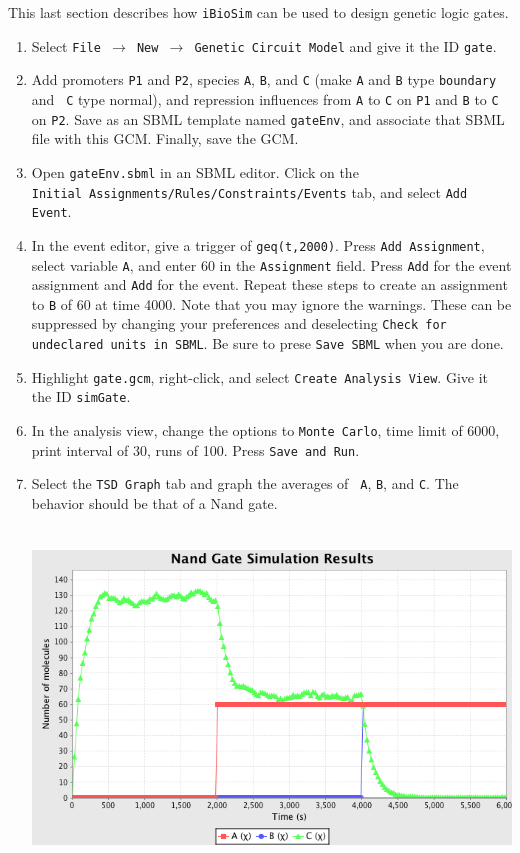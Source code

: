 \documentclass[titlepage,11pt]{article}
\begin{document}
This last section describes how {\tt iBioSim} can be used to design
genetic logic gates.
\begin{enumerate}
\item Select {\tt File $\rightarrow$ New $\rightarrow$ Genetic Circuit
    Model} and give it the ID {\tt gate}.
\item Add promoters {\tt P1} and {\tt P2}, species {\tt A}, {\tt B},
  and {\tt C} (make {\tt A} and {\tt B} type {\tt boundary} and {\tt
    C} type normal), and repression influences from {\tt A} to {\tt C} on
  {\tt P1} and {\tt B} to {\tt C} on {\tt P2}.  Save as an SBML
  template named {\tt gateEnv}, and associate that SBML file with this
  GCM.  Finally, save the GCM.
\item Open {\tt gateEnv.sbml} in an SBML editor.  Click on the\\ 
      {\tt Initial Assignments/Rules/Constraints/Events} tab, and
      select {\tt Add Event}.
\item In the event editor, give a trigger of {\tt geq(t,2000)}.   
      Press {\tt Add Assignment}, select variable {\tt A}, and enter
      60 in the {\tt Assignment} field.  Press {\tt Add} for the event
      assignment and {\tt Add} for the event.  Repeat these steps to
      create an assignment to {\tt B} of 60 at time 4000.  Note that
      you may ignore the warnings.  These can be suppressed by
      changing your preferences and deselecting {\tt Check for
        undeclared units in SBML}.  Be sure to prese {\tt Save SBML}
      when you are done.
\item Highlight {\tt gate.gcm}, right-click, and select {\tt Create
    Analysis View}.  Give it the ID {\tt simGate}.
\item In the analysis view, change the options to 
      {\tt Monte Carlo}, time limit of 6000, print interval of 30,
      runs of 100.  
      Press {\tt Save and Run}.
\item Select the {\tt TSD Graph} tab and graph the averages of {\tt
    A},  {\tt B}, and {\tt C}.  The behavior should be that of a Nand
  gate.

\includegraphics[height=90mm]{screenshots/nandResults}


\end{enumerate}
\end{document}
